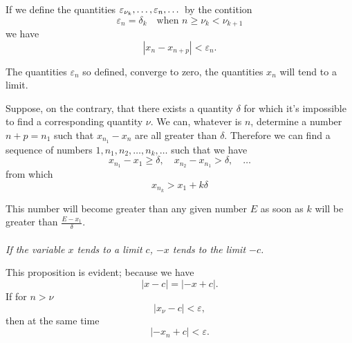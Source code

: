 \documentclass[10pt,letterpaper]{book}
\renewcommand\epsilon{\varepsilon}
\theoremstyle{definition}
\begin{document}
If we define the quantities $\jseq{\epsilon_{\nu_k}}{\epsilon_n}$ by the contition
\[
  \epsilon_n = \delta_k\quad\mbox{when }n\geq\nu_k<\nu_{k+1}
\]
we have
\[
  |x_{n}-x_{n+p}| < \epsilon_n.
\]

The quantities $\epsilon_n$ so defined, converge to zero, the quantities $x_n$ will tend to a limit.

Suppose, on the contrary, that there exists a quantity $\delta$ for which it's impossible to find a corresponding quantity $\nu$. We can, whatever is $n$, determine a number $n+p=n_1$ such that $x_{n_1}-x_n$ are all greater than $\delta$.
Therefore we can find a sequence of numbers $1, n_1, n_2,\dots,n_k,\dots$ such that we have
\[
  x_{n_1}-x_1\geq \delta,\quad x_{n_2}-x_{n_1}>\delta,\quad\dots
\]
from which
\[
  x_{n_k}>x_1+k\delta
\]

This number will become greater than any given number $E$ as soon as $k$ will be greater than $\frac{E-x_1}{\delta}$.

\paragraph{} \textit{If the variable $x$ tends to a limit $c$, $-x$ tends to the limit $-c$.}

This proposition is evident; because we have
\[
  |x-c|=|-x+c|.
\]
If for $n>\nu$
\[
  |x_\nu-c|<\epsilon,
\]
then at the same time
\[
  |-x_n+c|<\epsilon.
\]

\begin{thebibliography}{9}

\end{thebibliography}
\end{document}
